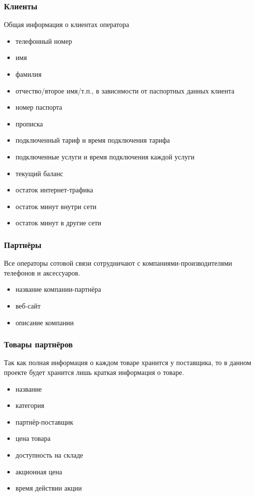 \subsubsection{Клиенты}
Общая информация о клиентах оператора
\begin{itemize}
    \item телефонный номер
    \item имя
    \item фамилия
    \item отчество/второе имя/т.п., в зависимости от паспортных данных клиента
    \item номер паспорта
    \item прописка
    \item подключенный тариф и время подключения тарифа
    \item подключенные услуги и время подключения каждой услуги
    \item текущий баланс
    \item остаток интернет-трафика
    \item остаток минут внутри сети
    \item остаток минут в другие сети
\end{itemize}

\subsubsection{Партнёры}
Все операторы сотовой связи сотрудничают с компаниями-производителями телефонов и аксессуаров.
\begin{itemize}
    \item название компании-партнёра
    \item веб-сайт
    \item описание компании
\end{itemize}

\subsubsection{Товары партнёров}
Так как полная информация о каждом товаре хранится у поставщика, то в данном проекте будет хранится лишь краткая информация о товаре.
\begin{itemize}
    \item название
    \item категория
    \item партнёр-поставщик
    \item цена товара
    \item доступность на складе
    \item акционная цена
    \item время действии акции
\end{itemize}

